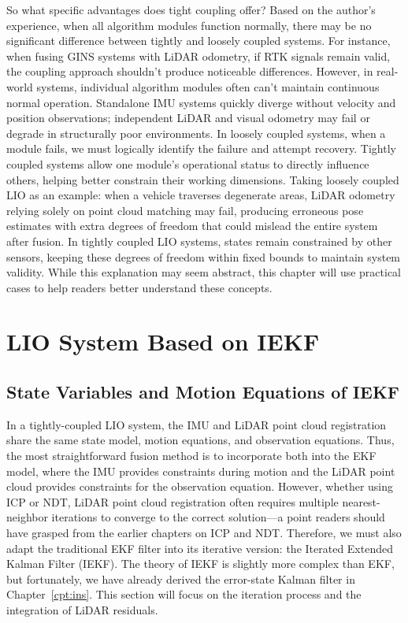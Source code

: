 So what specific advantages does tight coupling offer? Based on the author's experience, when all algorithm modules function normally, there may be no significant difference between tightly and loosely coupled systems. For instance, when fusing GINS systems with LiDAR odometry, if RTK signals remain valid, the coupling approach shouldn't produce noticeable differences. However, in real-world systems, individual algorithm modules often can't maintain continuous normal operation. Standalone IMU systems quickly diverge without velocity and position observations; independent LiDAR and visual odometry may fail or degrade in structurally poor environments. In loosely coupled systems, when a module fails, we must logically identify the failure and attempt recovery. Tightly coupled systems allow one module's operational status to directly influence others, helping better constrain their working dimensions. Taking loosely coupled LIO as an example: when a vehicle traverses degenerate areas, LiDAR odometry relying solely on point cloud matching may fail, producing erroneous pose estimates with extra degrees of freedom that could mislead the entire system after fusion. In tightly coupled LIO systems, states remain constrained by other sensors, keeping these degrees of freedom within fixed bounds to maintain system validity. While this explanation may seem abstract, this chapter will use practical cases to help readers better understand these concepts.

\section{LIO System Based on IEKF}  
\subsection{State Variables and Motion Equations of IEKF}  

In a tightly-coupled LIO system, the IMU and LiDAR point cloud registration share the same state model, motion equations, and observation equations. Thus, the most straightforward fusion method is to incorporate both into the EKF model, where the IMU provides constraints during motion and the LiDAR point cloud provides constraints for the observation equation. However, whether using ICP or NDT, LiDAR point cloud registration often requires multiple nearest-neighbor iterations to converge to the correct solution—a point readers should have grasped from the earlier chapters on ICP and NDT. Therefore, we must also adapt the traditional EKF filter into its iterative version: the Iterated Extended Kalman Filter (IEKF). The theory of IEKF is slightly more complex than EKF, but fortunately, we have already derived the error-state Kalman filter in Chapter~\ref{cpt:ins}. This section will focus on the iteration process and the integration of LiDAR residuals.  

